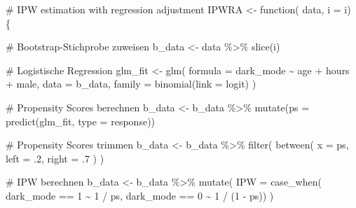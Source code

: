 \documentclass[
  a4paper,
  DIV=11,
  oneside]{scrreprt}
\newenvironment{Shaded}{\begin{snugshade}}{\end{snugshade}}
\newcommand{\AttributeTok}[1]{\textcolor[rgb]{0.40,0.45,0.13}{#1}}
\newcommand{\CommentTok}[1]{\textcolor[rgb]{0.37,0.37,0.37}{#1}}
\newcommand{\ControlFlowTok}[1]{\textcolor[rgb]{0.00,0.23,0.31}{#1}}
\newcommand{\DecValTok}[1]{\textcolor[rgb]{0.68,0.00,0.00}{#1}}
\newcommand{\FunctionTok}[1]{\textcolor[rgb]{0.28,0.35,0.67}{#1}}
\newcommand{\NormalTok}[1]{\textcolor[rgb]{0.00,0.23,0.31}{#1}}
\newcommand{\OtherTok}[1]{\textcolor[rgb]{0.00,0.23,0.31}{#1}}
\newcommand{\SpecialCharTok}[1]{\textcolor[rgb]{0.37,0.37,0.37}{#1}}
\newcommand{\StringTok}[1]{\textcolor[rgb]{0.13,0.47,0.30}{#1}}
\begin{document}
\begin{Shaded}
\begin{Highlighting}[]
\CommentTok{\# IPW estimation with regression adjustment}
\NormalTok{IPWRA }\OtherTok{\textless{}{-}} \ControlFlowTok{function}\NormalTok{(}
\NormalTok{    data, }
    \AttributeTok{i =}\NormalTok{ i) \{}
  
    \CommentTok{\# Bootstrap{-}Stichprobe zuweisen}
\NormalTok{    b\_data }\OtherTok{\textless{}{-}}\NormalTok{ data }\SpecialCharTok{\%\textgreater{}\%} 
      \FunctionTok{slice}\NormalTok{(i)}
    
    \CommentTok{\# Logistische Regression}
\NormalTok{    glm\_fit }\OtherTok{\textless{}{-}} \FunctionTok{glm}\NormalTok{(}
      \AttributeTok{formula =}\NormalTok{ dark\_mode }\SpecialCharTok{\textasciitilde{}}\NormalTok{ age }\SpecialCharTok{+}\NormalTok{ hours }\SpecialCharTok{+}\NormalTok{ male,}
      \AttributeTok{data =}\NormalTok{ b\_data, }
      \AttributeTok{family =} \FunctionTok{binomial}\NormalTok{(}\AttributeTok{link =} \StringTok{\textquotesingle{}logit\textquotesingle{}}\NormalTok{)}
\NormalTok{    )}
    
    \CommentTok{\# Propensity Scores berechnen}
\NormalTok{    b\_data }\OtherTok{\textless{}{-}}\NormalTok{ b\_data }\SpecialCharTok{\%\textgreater{}\%}
        \FunctionTok{mutate}\NormalTok{(}\AttributeTok{ps =} \FunctionTok{predict}\NormalTok{(glm\_fit, }\AttributeTok{type =} \StringTok{\textquotesingle{}response\textquotesingle{}}\NormalTok{))}
    
    \CommentTok{\# Propensity Scores trimmen}
\NormalTok{    b\_data }\OtherTok{\textless{}{-}}\NormalTok{ b\_data }\SpecialCharTok{\%\textgreater{}\%}
      \FunctionTok{filter}\NormalTok{(}
        \FunctionTok{between}\NormalTok{(}
          \AttributeTok{x =}\NormalTok{ ps,}
          \AttributeTok{left =}\NormalTok{ .}\DecValTok{2}\NormalTok{,}
          \AttributeTok{right =}\NormalTok{ .}\DecValTok{7}
\NormalTok{          )}
\NormalTok{    )}
    
    \CommentTok{\# IPW berechnen}
\NormalTok{    b\_data }\OtherTok{\textless{}{-}}\NormalTok{ b\_data }\SpecialCharTok{\%\textgreater{}\%}
      \FunctionTok{mutate}\NormalTok{(}
        \AttributeTok{IPW =} \FunctionTok{case\_when}\NormalTok{(}
\NormalTok{          dark\_mode }\SpecialCharTok{==} \DecValTok{1} \SpecialCharTok{\textasciitilde{}} \DecValTok{1} \SpecialCharTok{/}\NormalTok{ ps,}
\NormalTok{          dark\_mode }\SpecialCharTok{==} \DecValTok{0} \SpecialCharTok{\textasciitilde{}} \DecValTok{1} \SpecialCharTok{/}\NormalTok{ (}\DecValTok{1} \SpecialCharTok{{-}}\NormalTok{ ps))}
\NormalTok{      )}
    

\end{Highlighting}
\end{Shaded}
\end{document}
